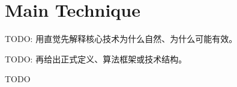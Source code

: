 \section{Main Technique}

TODO: 用直觉先解释核心技术为什么自然、为什么可能有效。

TODO: 再给出正式定义、算法框架或技术结构。

\begin{algorithm}
\caption{TODO: Main Algorithm}
\begin{algorithmic}[1]
\STATE TODO
\end{algorithmic}
\end{algorithm}
